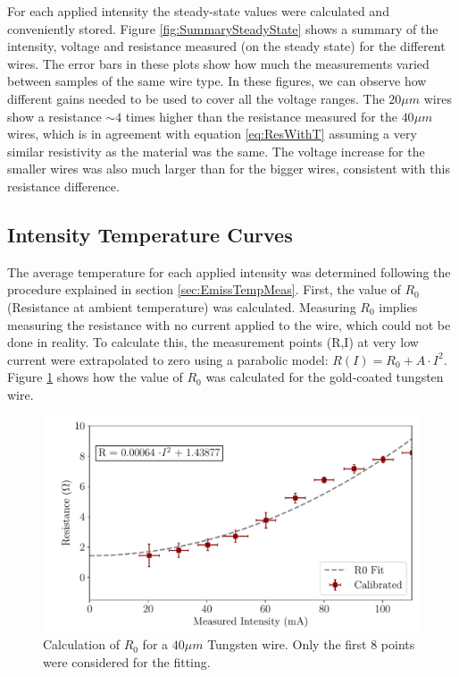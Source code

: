For each applied intensity the steady-state values were calculated and conveniently stored. Figure \ref{fig:SummarySteadyState} shows a summary of the intensity, voltage and resistance measured (on the steady state) for the different wires. The error bars in these plots show how much the measurements varied between samples of the same wire type. In these figures, we can observe how different gains needed to be used to cover all the voltage ranges. The $20 \mu m$ wires show a resistance $\sim 4$ times higher than the resistance measured for the $40 \mu m$ wires, which is in agreement with equation \ref{eq:ResWithT} assuming a very similar resistivity as the material was the same. The voltage increase for the smaller wires was also much larger than for the bigger wires, consistent with this resistance difference. 

\subsection{Intensity Temperature Curves}

The average temperature for each applied intensity was determined following the procedure explained in section \ref{sec:EmissTempMeas}. First, the value of $R_0$ (Resistance at ambient temperature) was calculated. Measuring $R_0$ implies measuring the resistance with no current applied to the wire, which could not be done in reality. To calculate this, the measurement points (R,I) at very low current were extrapolated to zero using a parabolic model: $R(I) = R_{0} + A\cdot I^2$. Figure \ref{fig:R0Calc} shows how the value of $R_0$ was calculated for the gold-coated tungsten wire. 

\begin{figure}[h!]
    \centering
    \includegraphics[width=0.8\columnwidth]{Figure_CalculateR0/CalcR0.pdf}
    \caption{Calculation of $R_0$ for a $40 \mu m$ Tungsten wire. Only the first 8 points were considered for the fitting. }
    \label{fig:R0Calc}
\end{figure}

